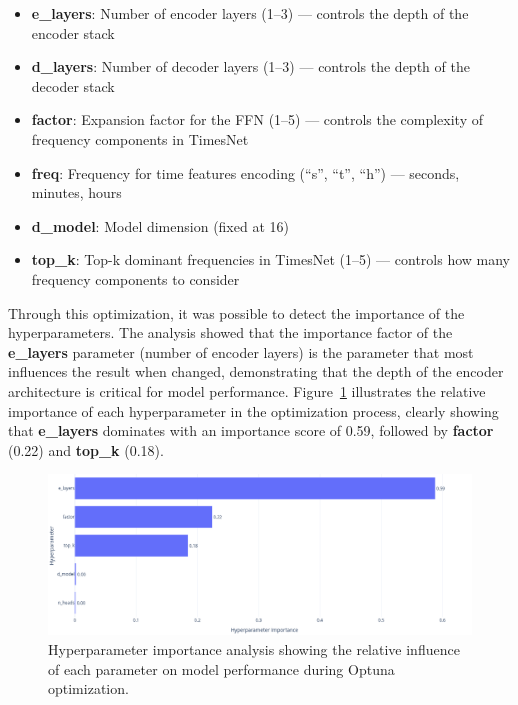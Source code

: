 \begin{itemize}
    \item \textbf{e\_layers}: Number of encoder layers (1--3) --- controls the depth of the encoder stack
    \item \textbf{d\_layers}: Number of decoder layers (1--3) --- controls the depth of the decoder stack  
    \item \textbf{factor}: Expansion factor for the FFN (1--5) --- controls the complexity of frequency components in TimesNet
    \item \textbf{freq}: Frequency for time features encoding (``s'', ``t'', ``h'') --- seconds, minutes, hours
    \item \textbf{d\_model}: Model dimension (fixed at 16)
    \item \textbf{top\_k}: Top-k dominant frequencies in TimesNet (1--5) --- controls how many frequency components to consider
\end{itemize}

Through this optimization, it was possible to detect the importance of the hyperparameters. The analysis showed that the importance factor of the \textbf{e\_layers} parameter (number of encoder layers) is the parameter that most influences the result when changed, demonstrating that the depth of the encoder architecture is critical for model performance. Figure~\ref{fig:hyperparameter_importance} illustrates the relative importance of each hyperparameter in the optimization process, clearly showing that \textbf{e\_layers} dominates with an importance score of 0.59, followed by \textbf{factor} (0.22) and \textbf{top\_k} (0.18).

\begin{figure}[htbp]
    \centering
    \includegraphics[width=1\textwidth]{imgs/Hyperparameter_importance.png}
    \caption{Hyperparameter importance analysis showing the relative influence of each parameter on model performance during Optuna optimization.}
    \label{fig:hyperparameter_importance}
\end{figure}

